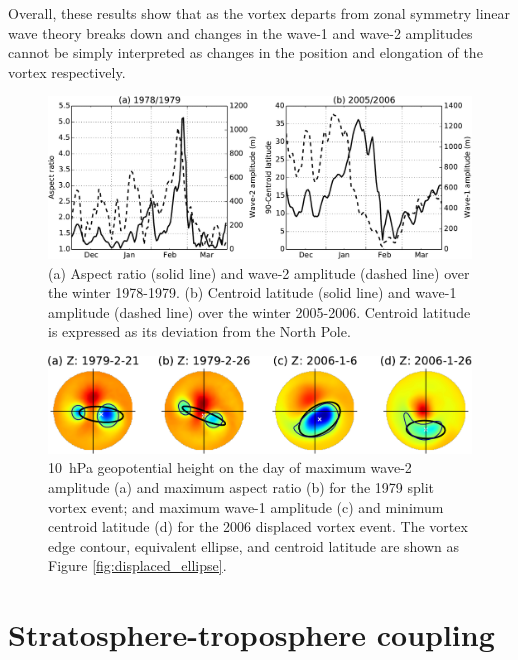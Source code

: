 Overall, these results show that as the vortex departs from zonal symmetry
linear wave theory breaks down and changes in the wave-1 and wave-2 amplitudes
cannot be simply interpreted as changes in the position and elongation of the
vortex respectively.


\begin{figure}
 \centering
 \noindent\includegraphics[width=\textwidth]{figures/chapter-moments/waves_moments_ts.pdf}
 \caption[Wave amplitude and moment diagnostic time series.]{(a) Aspect ratio
   (solid line) and wave-2 amplitude (dashed line) over the winter
   1978-1979. (b) Centroid latitude (solid line) and wave-1 amplitude (dashed
   line) over the winter 2005-2006. Centroid latitude is expressed as its
   deviation from the North Pole.}
 \label{fig:wave_moments_ts}
\end{figure}

\begin{figure}
 \centering
 \noindent\includegraphics[width=\textwidth]{figures/chapter-moments/wave_moment_vortices.pdf}
 \caption[Comparison of vortex at maximum of moment diagnostics and wave
 amplitudes.]{10~hPa geopotential height on the day of maximum wave-2 amplitude
   (a) and maximum aspect ratio (b) for the 1979 split vortex event; and maximum
   wave-1 amplitude (c) and minimum centroid latitude (d) for the 2006 displaced
   vortex event. The vortex edge contour, equivalent ellipse, and centroid
   latitude are shown as Figure \ref{fig:displaced_ellipse}.}
 \label{fig:wave_moments_vortex}
\end{figure}


\section{Stratosphere-troposphere coupling}
\label{sec:moments_analysis}

